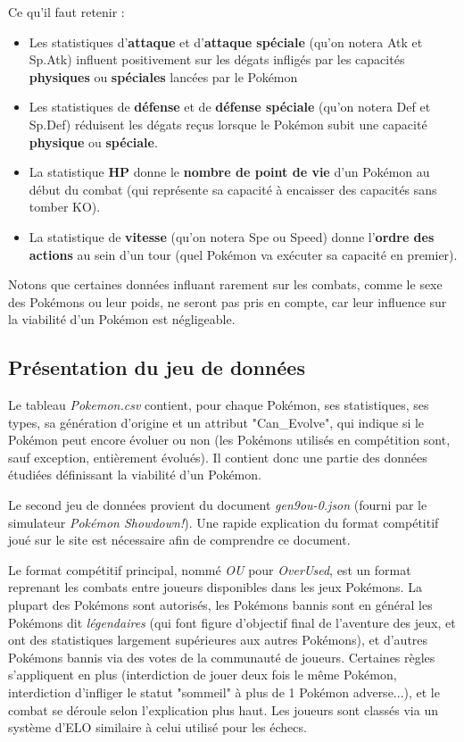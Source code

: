 \documentclass[a4paper,12pt]{article}
\begin{document}
Ce qu'il faut retenir :
\begin{itemize}
    \item Les statistiques d'\textbf{attaque} et d'\textbf{attaque spéciale}
    (qu'on notera Atk et Sp.Atk) influent positivement sur les dégats infligés
    par les capacités \textbf{physiques} ou \textbf{spéciales} lancées par le
    Pokémon
    \item Les statistiques de \textbf{défense} et de \textbf{défense spéciale}
    (qu'on notera Def et Sp.Def) réduisent les dégats reçus lorsque le Pokémon
    subit une capacité \textbf{physique} ou \textbf{spéciale}.
    \item La statistique \textbf{HP} donne le \textbf{nombre de point de vie}
    d'un Pokémon au début du combat (qui représente sa capacité à encaisser des
    capacités sans tomber KO).
    \item La statistique de \textbf{vitesse} (qu'on notera Spe ou Speed) donne
    l'\textbf{ordre des actions} au sein d'un tour (quel Pokémon va exécuter sa
    capacité en premier).
\end{itemize}

Notons que certaines données influant rarement sur les combats, comme le sexe
des Pokémons ou leur poids, ne seront pas pris en compte, car leur influence sur
la viabilité d'un Pokémon est négligeable.

\subsection{Présentation du jeu de données}
Le tableau \textit{Pokemon.csv} contient, pour chaque Pokémon, ses statistiques,
ses types, sa génération d'origine et un attribut "Can\_Evolve", qui indique si
le Pokémon peut encore évoluer ou non (les Pokémons utilisés en compétition
sont, sauf exception, entièrement évolués). Il contient donc une partie des
données étudiées définissant la viabilité d'un Pokémon.

Le second jeu de données provient du document \textit{gen9ou-0.json} (fourni par
le simulateur \textit{Pokémon Showdown!}). Une rapide explication du format
compétitif joué sur le site est nécessaire afin de comprendre ce document.

Le format compétitif principal, nommé \textit{OU} pour \textit{OverUsed}, est un
format reprenant les combats entre joueurs disponibles dans les jeux Pokémons.
La plupart des Pokémons sont autorisés, les Pokémons bannis sont en général les
Pokémons dit \textit{légendaires} (qui font figure d'objectif final de
l'aventure des jeux, et ont des statistiques largement supérieures aux autres
Pokémons), et d'autres Pokémons bannis via des votes de la communauté de
joueurs. Certaines règles s'appliquent en plus (interdiction de jouer deux fois
le même Pokémon, interdiction d'infliger le statut "sommeil" à plus de 1 Pokémon
adverse...), et le combat se déroule selon l'explication plus haut. Les joueurs
sont classés via un système d'ELO similaire à celui utilisé pour les échecs.
\end{document}
